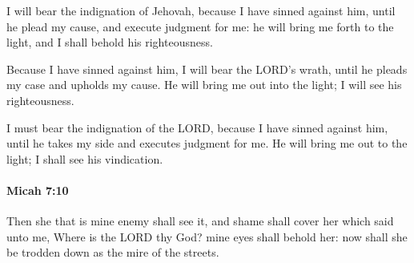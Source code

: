 			\begin{versebox}
					\item[BHS] 
					\item[LXX] 
					\item[ASV] I will bear the indignation of Jehovah, because I have sinned against him, until he plead my cause, and execute judgment for me: he will bring me forth to the light, and I shall behold his righteousness.
					\item[NIV] Because I have sinned against him, I will bear the LORD’s wrath, until he pleads my case and upholds my cause. He will bring me out into the light; I will see his righteousness.
					\item[NRSV] I must bear the indignation of the LORD, because I have sinned against him, until he takes my side and executes judgment for me. He will bring me out to the light; I shall see his vindication.
			\end{versebox}

		\paragraph{Micah 7:10} %
			\label{MICAH-7-10}

			Then she that is mine enemy shall see it, and shame shall cover her which said unto me, Where is the LORD thy God? mine eyes shall behold her: now shall she be trodden down as the mire of the streets.

